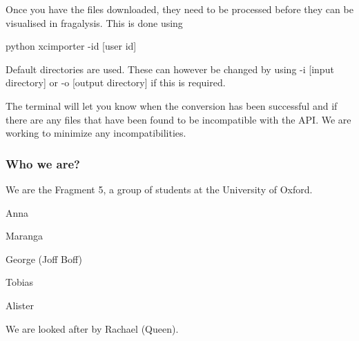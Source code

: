 Once you have the files downloaded, they need to be processed before they can be visualised in fragalysis. This is done using


\begin{DoxyCode}
python xcimporter -id [user id] 
\end{DoxyCode}


Default directories are used. These can however be changed by using {\ttfamily -\/i \mbox{[}input directory\mbox{]}} or {\ttfamily -\/o \mbox{[}output directory\mbox{]}} if this is required.

The terminal will let you know when the conversion has been successful and if there are any files that have been found to be incompatible with the A\+PI. We are working to minimize any incompatibilities.

\subsubsection*{Who we are?}

We are the \textquotesingle{}Fragment 5\textquotesingle{}, a group of students at the University of Oxford.


\begin{DoxyItemize}
\item Anna
\item Maranga
\item George (Joff Boff)
\item Tobias
\item Alister
\end{DoxyItemize}

We are looked after by Rachael (Queen). 